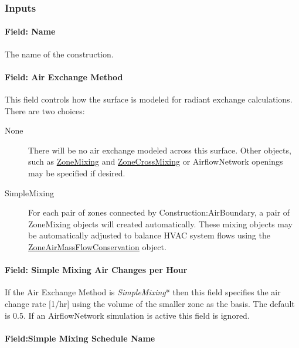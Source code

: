 \subsubsection{Inputs}\label{inputs-38-01}

\paragraph{Field: Name}\label{field-name-31-0001}

The name of the construction.

\paragraph{Field: Air Exchange Method}\label{field-air-exchange-method}

This field controls how the surface is modeled for radiant exchange calculations. There are two choices:

\begin{description}
  \item[None] There will be no air exchange modeled across this surface. Other objects, such as \hyperref[zonemixing]{ZoneMixing} and \hyperref[zonecrossmixing]{ZoneCrossMixing} or AirflowNetwork openings may be specified if desired.
  \item[SimpleMixing] For each pair of zones connected by Construction:AirBoundary, a pair of ZoneMixing objects will created automatically. These mixing objects may be automatically adjusted to balance HVAC system flows using the \hyperref[zoneairmassflowconservation]{ZoneAirMassFlowConservation} object.
\end{description}

\paragraph{Field: Simple Mixing Air Changes per Hour}\label{field-simple-mixing-air-changes-per-hour}

If the Air Exchange Method is \textit{SimpleMixing}* then this field specifies the air change rate [1/hr] using the volume of the smaller zone as the basis. The default is 0.5. If an AirflowNetwork simulation is active this field is ignored.

\paragraph{Field:Simple Mixing Schedule Name}\label{field-Simple-mixing-schedule-name}

